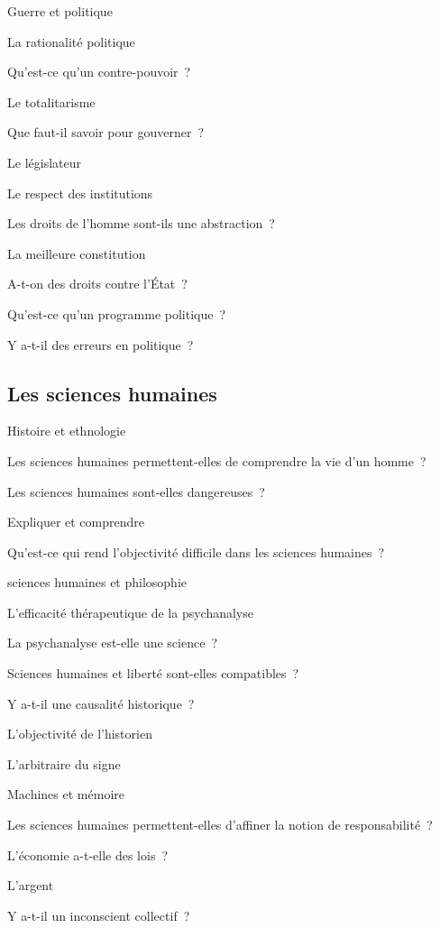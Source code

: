 \documentclass[a4paper]{article}
\begin{document}
Guerre et politique

La rationalité politique

Qu'est-ce qu'un contre-pouvoir ?

Le totalitarisme

Que faut-il savoir pour gouverner ?

Le législateur

Le respect des institutions

Les droits de l'homme sont-ils une abstraction ?

La meilleure constitution

A-t-on des droits contre l'État ?

Qu'est-ce qu'un programme politique ?

Y a-t-il des erreurs en politique ?
\subsection{Les sciences humaines}
\label{sec-6-6}


Histoire et ethnologie

Les sciences humaines permettent-elles de comprendre la vie d'un homme ?

Les sciences humaines sont-elles dangereuses ?

Expliquer et comprendre

Qu'est-ce qui rend l'objectivité difficile dans les sciences humaines ?

sciences humaines et philosophie

L'efficacité thérapeutique de la psychanalyse

La psychanalyse est-elle une science ?

Sciences humaines et liberté sont-elles compatibles ?

Y a-t-il une causalité historique ?

L'objectivité de l'historien

L'arbitraire du signe

Machines et mémoire

Les sciences humaines permettent-elles d'affiner la notion de
responsabilité ?

L'économie a-t-elle des lois ?

L'argent

Y a-t-il un inconscient collectif ?
\end{document}
